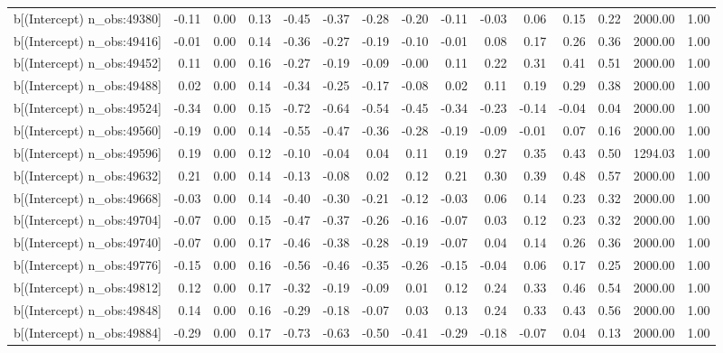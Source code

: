 \begin{table}[ht]
\begin{tabular}{rrrrrrrrrrrrrrr}
  b[(Intercept) n\_obs:49380] & -0.11 & 0.00 & 0.13 & -0.45 & -0.37 & -0.28 & -0.20 & -0.11 & -0.03 & 0.06 & 0.15 & 0.22 & 2000.00 & 1.00 \\ 
  b[(Intercept) n\_obs:49416] & -0.01 & 0.00 & 0.14 & -0.36 & -0.27 & -0.19 & -0.10 & -0.01 & 0.08 & 0.17 & 0.26 & 0.36 & 2000.00 & 1.00 \\ 
  b[(Intercept) n\_obs:49452] & 0.11 & 0.00 & 0.16 & -0.27 & -0.19 & -0.09 & -0.00 & 0.11 & 0.22 & 0.31 & 0.41 & 0.51 & 2000.00 & 1.00 \\ 
  b[(Intercept) n\_obs:49488] & 0.02 & 0.00 & 0.14 & -0.34 & -0.25 & -0.17 & -0.08 & 0.02 & 0.11 & 0.19 & 0.29 & 0.38 & 2000.00 & 1.00 \\ 
  b[(Intercept) n\_obs:49524] & -0.34 & 0.00 & 0.15 & -0.72 & -0.64 & -0.54 & -0.45 & -0.34 & -0.23 & -0.14 & -0.04 & 0.04 & 2000.00 & 1.00 \\ 
  b[(Intercept) n\_obs:49560] & -0.19 & 0.00 & 0.14 & -0.55 & -0.47 & -0.36 & -0.28 & -0.19 & -0.09 & -0.01 & 0.07 & 0.16 & 2000.00 & 1.00 \\ 
  b[(Intercept) n\_obs:49596] & 0.19 & 0.00 & 0.12 & -0.10 & -0.04 & 0.04 & 0.11 & 0.19 & 0.27 & 0.35 & 0.43 & 0.50 & 1294.03 & 1.00 \\ 
  b[(Intercept) n\_obs:49632] & 0.21 & 0.00 & 0.14 & -0.13 & -0.08 & 0.02 & 0.12 & 0.21 & 0.30 & 0.39 & 0.48 & 0.57 & 2000.00 & 1.00 \\ 
  b[(Intercept) n\_obs:49668] & -0.03 & 0.00 & 0.14 & -0.40 & -0.30 & -0.21 & -0.12 & -0.03 & 0.06 & 0.14 & 0.23 & 0.32 & 2000.00 & 1.00 \\ 
  b[(Intercept) n\_obs:49704] & -0.07 & 0.00 & 0.15 & -0.47 & -0.37 & -0.26 & -0.16 & -0.07 & 0.03 & 0.12 & 0.23 & 0.32 & 2000.00 & 1.00 \\ 
  b[(Intercept) n\_obs:49740] & -0.07 & 0.00 & 0.17 & -0.46 & -0.38 & -0.28 & -0.19 & -0.07 & 0.04 & 0.14 & 0.26 & 0.36 & 2000.00 & 1.00 \\ 
  b[(Intercept) n\_obs:49776] & -0.15 & 0.00 & 0.16 & -0.56 & -0.46 & -0.35 & -0.26 & -0.15 & -0.04 & 0.06 & 0.17 & 0.25 & 2000.00 & 1.00 \\ 
  b[(Intercept) n\_obs:49812] & 0.12 & 0.00 & 0.17 & -0.32 & -0.19 & -0.09 & 0.01 & 0.12 & 0.24 & 0.33 & 0.46 & 0.54 & 2000.00 & 1.00 \\ 
  b[(Intercept) n\_obs:49848] & 0.14 & 0.00 & 0.16 & -0.29 & -0.18 & -0.07 & 0.03 & 0.13 & 0.24 & 0.33 & 0.43 & 0.56 & 2000.00 & 1.00 \\ 
  b[(Intercept) n\_obs:49884] & -0.29 & 0.00 & 0.17 & -0.73 & -0.63 & -0.50 & -0.41 & -0.29 & -0.18 & -0.07 & 0.04 & 0.13 & 2000.00 & 1.00 \\ 

\end{tabular}
\end{table}
